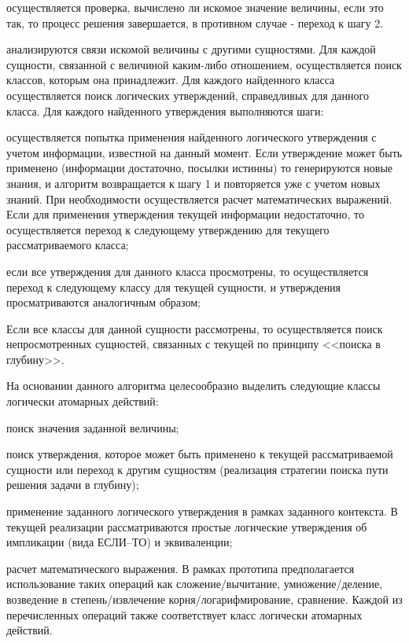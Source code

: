 \begin{SCn}
{\begin{scnitemize}
\begin{scnenumerate}
    \item осуществляется проверка, вычислено ли искомое значение величины, если это так, то процесс решения завершается, в противном случае - переход к шагу 2.
    \item анализируются связи искомой величины с другими сущностями. Для каждой сущности, связанной с величиной каким-либо отношением, осуществляется поиск классов, которым она принадлежит. Для каждого найденного класса осуществляется поиск логических утверждений, справедливых для данного класса. Для каждого найденного утверждения выполняются шаги:
    \begin{scnitemizeii}
        \item осуществляется попытка применения найденного логического утверждения с учетом информации, известной на данный момент. Если утверждение может быть применено (информации достаточно, посылки истинны) то генерируются новые знания, и алгоритм возвращается к шагу 1 и повторяется уже с учетом новых знаний. При необходимости осуществляется расчет математических выражений. Если для применения утверждения текущей информации недостаточно, то осуществляется переход к следующему утверждению для текущего рассматриваемого класса;
        \item если все утверждения для данного класса просмотрены, то осуществляется переход к следующему классу для текущей сущности, и утверждения просматриваются аналогичным образом;
    \end{scnitemizeii}

\item Если все классы для данной сущности рассмотрены, то осуществляется поиск непросмотренных сущностей, связанных с текущей по принципу <<поиска в глубину>>.
\end{scnenumerate}

На основании данного алгоритма целесообразно выделить следующие классы логически атомарных действий:
\begin{scnitemizeii}
    \item поиск значения заданной величины;
    \item поиск утверждения, которое может быть применено к текущей рассматриваемой сущности или переход к другим сущностям (реализация стратегии поиска пути решения задачи в глубину);
    \item применение заданного логического утверждения в рамках заданного контекста. В текущей реализации рассматриваются простые логические утверждения об импликации (вида ЕСЛИ--ТО) и эквиваленции;
    \item расчет математического выражения. В рамках прототипа предполагается использование таких операций как сложение/вычитание, умножение/деление, возведение в степень/извлечение корня/логарифмирование, сравнение. Каждой из перечисленных операций также соответствует класс логически атомарных действий.
\end{scnitemizeii}


\end{scnitemize}}
\end{SCn}
